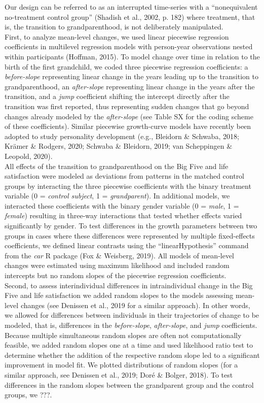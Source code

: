 \documentclass[
  english,
  man, noextraspace]{apa7}
\begin{document}
Our design can be referred to as an interrupted time-series with a \enquote{nonequivalent no-treatment control group} (Shadish et al., 2002, p. 182) where treatment, that is, the transition to grandparenthood, is not deliberately manipulated.\\
First, to analyze mean-level changes, we used linear piecewise regression coefficients in multilevel regression models with person-year observations nested within participants (Hoffman, 2015). To model change over time in relation to the birth of the first grandchild, we coded three piecewise regression coefficients: a \emph{before-slope} representing linear change in the years leading up to the transition to grandparenthood, an \emph{after-slope} representing linear change in the years after the transition, and a \emph{jump} coefficient shifting the intercept directly after the transition was first reported, thus representing sudden changes that go beyond changes already modeled by the \emph{after-slope} (see Table SX for the coding scheme of these coefficients). Similar piecewise growth-curve models have recently been adopted to study personality development (e.g., Bleidorn \& Schwaba, 2018; Krämer \& Rodgers, 2020; Schwaba \& Bleidorn, 2019; van Scheppingen \& Leopold, 2020).\\
All effects of the transition to grandparenthood on the Big Five and life satisfaction were modeled as deviations from patterns in the matched control groups by interacting the three piecewise coefficients with the binary treatment variable (0 = \emph{control subject}, 1 = \emph{grandparent}). In additional models, we interacted these coefficients with the binary gender variable (0 = \emph{male}, 1 = \emph{female}) resulting in three-way interactions that tested whether effects varied significantly by gender. To test differences in the growth parameters between two groups in cases where these differences were represented by multiple fixed-effects coefficients, we defined linear contrasts using the \enquote{linearHypothesis} command from the \emph{car} R package (Fox \& Weisberg, 2019). All models of mean-level changes were estimated using maximum likelihood and included random intercepts but no random slopes of the piecewise regression coefficients.\\
Second, to assess interindividual differences in intraindividual change in the Big Five and life satisfaction we added random slopes to the models assessing mean-level changes (see Denissen et al., 2019 for a similar approach). In other words, we allowed for differences between individuals in their trajectories of change to be modeled, that is, differences in the \emph{before-slope}, \emph{after-slope}, and \emph{jump} coefficients. Because multiple simultaneous random slopes are often not computationally feasible, we added random slopes one at a time and used likelihood ratio test to determine whether the addition of the respective random slope led to a significant improvement in model fit. We plotted distributions of random slopes (for a similar approach, see Denissen et al., 2019; Doré \& Bolger, 2018). To test differences in the random slopes between the grandparent group and the control groups, we ???.\\
\end{document}
